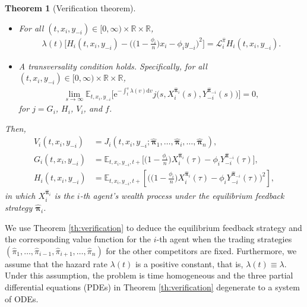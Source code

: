 \documentclass[11pt]{article}
\newtheorem{theorem}{Theorem}[section]
\newcommand \drm {\mathrm{d}}
\newcommand \e {\mathrm{e}}
\numberwithin{equation}{section}
\newcommand{\bpi}{\boldsymbol{\pi}}
\providecommand{\smn}{{-}} %
\begin{document}
\begin{theorem}[Verification theorem]
\begin{itemize}
\begin{align}
				\lambda(t)\Big[ G_i(t,x_i,y_{\smn i})-\Big(\big(1-\frac{\phi_i}{n}\big)x_i-\phi_i y_{\smn i}\Big)\Big]=\mathcal{L}^{\widehat{{\pi}}}_iG_i(t,x_i,y_{\smn i}).
			\end{align}
			\item[$(3)$] For all \( (t,x_i,y_{\smn i})\in [0,\infty)\times \mathbb{R}\times \mathbb{R}\),
			\begin{align}\label{eq:LH}
				\lambda(t)\Big[H_i(t,x_i,y_{\smn i})-\Big(\big(1-\frac{\phi_i}{n}\big)x_i-\phi_i y_{\smn i}\Big)^2\Big]=\mathcal{L}_i^{\widehat{{\pi}}}H_i(t,x_i,y_{\smn i}).
			\end{align}
			\item[$(4)$] A transversality condition holds. Specifically, for all \( (t,x_i,y_{\smn i})\in [0,\infty)\times \mathbb{R}\times \mathbb{R}\),
			\begin{align}\label{eq:T}
				\lim_{s\to \infty}\mathbb{E}_{t,x_i,y_{\smn i}}\Big[\e^{-\int_t^s \lambda(v)\drm v} j\big(s,X^{\widehat{\bm{\pi}}_i}_i(s),
Y^{\widehat{\bpi}_{\smn i}}_{\smn i}(s)\big)\Big]=0,
			\end{align}
			for \(j=G_i\), \(H_i\), \(V_i\), and \(f\).
		\end{itemize}
		Then,
		\begin{align}
			V_i(t,x_i,y_{\smn i})&=J_i(t,x_i,y_{\smn i};\widehat{\bm{\pi}}_1,\ldots,\widehat{\bm{\pi}}_i,\ldots,\widehat{\bm{\pi}}_n),\\
			G_i(t,x_i,y_{\smn i})&=\mathbb{E}_{t,x_i,y_{\smn i},t+}\Big[\big(1-\frac{\phi_i}{n}\big)X_i^{\widehat{\bm{\pi}}_i}(\tau)-\phi_i Y^{\widehat{\bpi}_{\smn i}}_{\smn i}(\tau)\Big],\\
			H_i(t,x_{i},y_{\smn i})&=\mathbb{E}_{t,x_i,y_{\smn i},t+}\left[\Big(\big(1-\frac{\phi_i}{n}\big)X_i^{\widehat{\bm{\pi}}_i}(\tau)-\phi_i Y^{\widehat{\bpi}_{\smn i}}_{\smn i}(\tau)\Big)^2\right],
		\end{align}
		in which $X^{\widehat{\bm{\pi}}_i}_i$ is the $i$-th agent's wealth process under the equilibrium feedback strategy  $\widehat{\bm{\pi}}_i$.
	\end{theorem}
	We use Theorem \ref{th:verification} to deduce the equilibrium feedback strategy and the corresponding value function for the $i$-th agent when the trading strategies $(\widehat{\pi}_1, \ldots, \widehat{\pi}_{i-1}, \widehat{\pi}_{i+1}, \ldots, \widehat{\pi}_n)$ for the other competitors are fixed. Furthermore, we assume that the hazard rate \(\lambda(t)\) is a positive constant, that is, \(\lambda(t) \equiv \lambda\). Under this assumption, the problem is time homogeneous and the three partial differential equations (PDEs) in Theorem \ref{th:verification} degenerate to a system of ODEs.
	
\end{document}
